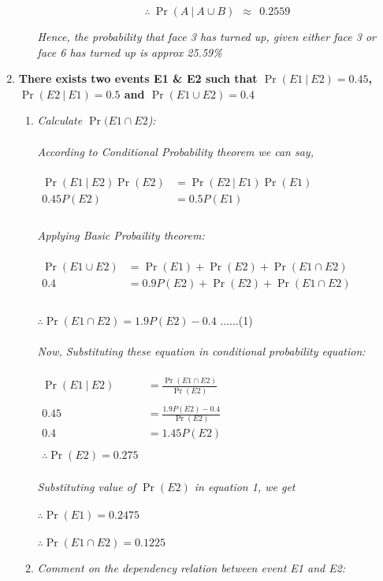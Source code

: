 \documentclass{article}
\begin{document}
\begin{enumerate}
\begin{enumerate}
        \[
          \boxed{\therefore\ \Pr(A \ |\ A \cup B)\ \ \approx \ \ 0.2559}
        \]
        
        \textit{Hence, the probability that face 3 has turned up, given either face 3 or face 6 has turned up is approx 25.59\%}
\end{enumerate}
\newpage
\item \textbf{There exists two events E1 \& E2 such that $\Pr(E1 \ |\ E2) = 0.45$, $\Pr(E2 \ |\ E1) = 0.5$ and $\Pr(E1 \cup E2) = 0.4$}
  \begin{enumerate}
    \item\textit{Calculate $\Pr(E1 \cap E2$):}\\\\
    \textit{According to Conditional Probability theorem we can say,}\\\\
    $\begin{aligned}
      \Pr(E1 \ |\ E2)\Pr(E2) & = \Pr(E2 \ |\ E1)\Pr(E1)\\
      0.45P(E2) & = 0.5P(E1) \\
    \end{aligned}$\\\\
    \textit{Applying Basic Probaility theorem:}\\\\
    $\begin{aligned}
      \Pr(E1 \cup E2) & = \Pr(E1) + \Pr(E2) + \Pr(E1 \cap E2)\\
      0.4 & = 0.9P(E2) + \Pr(E2) + \Pr(E1 \cap E2)\\\\
    \end{aligned}$

    $\therefore \Pr(E1 \cap E2) = 1.9P(E2) - 0.4$ \hspace{8cm}......(1)\\\\
    \textit{Now, Substituting these equation in conditional probability equation:}\\\\
    $\begin{aligned}
      \Pr(E1 \ |\ E2) & = \frac{\Pr(E1 \cap E2)}{\Pr(E2)}\\\\
      0.45 & = \frac{1.9P(E2) - 0.4}{\Pr(E2)}\\
      0.4 & = 1.45P(E2)\\\\
      \therefore \Pr(E2) = 0.275
    \end{aligned}$\\\\
    \textit{Substituting value of $\Pr(E2)$ in equation 1, we get}\\\\
    $\therefore \Pr(E1) = 0.2475$\\\\
    $\therefore \Pr(E1 \cap E2) = 0.1225$\\
    \item \textit{ Comment on the dependency relation between event E1 and E2:}
    

\end{enumerate}
\end{enumerate}
\end{document}

